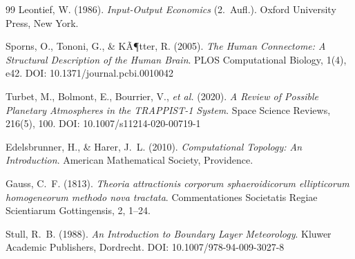 ﻿\documentclass[a4paper,12pt]{article}
\theoremstyle{definition}
\begin{document}
\begin{thebibliography}{99}
Leontief, W. (1986).
\textit{Input-Output Economics} (2.~Aufl.).
Oxford University Press, New York.

Sporns, O., Tononi, G., \& KÃ¶tter, R. (2005).
\textit{The Human Connectome: A Structural Description of the Human Brain}.
PLOS Computational Biology, 1(4), e42.
DOI: 10.1371/journal.pcbi.0010042

Turbet, M., Bolmont, E., Bourrier, V., \textit{et al.} (2020).
\textit{A Review of Possible Planetary Atmospheres in the TRAPPIST-1
System}. Space Science Reviews, 216(5), 100.
DOI: 10.1007/s11214-020-00719-1

Edelsbrunner, H., \& Harer, J.~L. (2010).
\textit{Computational Topology: An Introduction}.
American Mathematical Society, Providence.

Gauss, C.~F. (1813).
\textit{Theoria attractionis corporum sphaeroidicorum ellipticorum
homogeneorum methodo nova tractata}.
Commentationes Societatis Regiae Scientiarum Gottingensis, 2, 1--24.

Stull, R.~B. (1988).
\textit{An Introduction to Boundary Layer Meteorology}.
Kluwer Academic Publishers, Dordrecht.
DOI: 10.1007/978-94-009-3027-8

\end{thebibliography}
\end{document}
